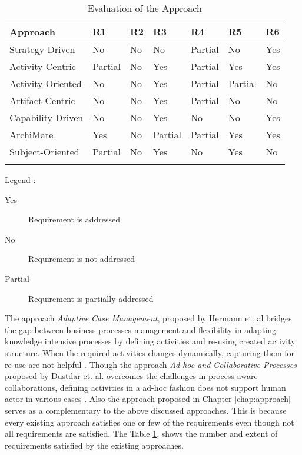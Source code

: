\begin{center}
	\begin{longtable}{p{6cm}p{1.5cm}p{1.5cm}p{1.5cm}p{1.5cm}p{1.5cm}p{2cm}} 
		\toprule 
		\textbf{Approach} & \textbf{R1}  & \textbf{R2}  & \textbf{R3}  & \textbf{R4}  & \textbf{R5} & \textbf{R6} \\
		\midrule
		\endfirsthead
		
		Strategy-Driven & No  & No  & No  & Partial  & No  & Yes\\
		Activity-Centric   & Partial   & No  & Yes  & Partial  & Yes  & Yes \\
		Activity-Oriented    & No  & No  & Yes  & Partial   & Partial  & No \\
		Artifact-Centric    & No  & No  & Yes  & Partial & No  & No \\ %
		Capability-Driven   & No  & No  & Yes  & No  & No  & Yes\\
		ArchiMate  & Yes  & No  & Partial  & Partial  & Yes  & Yes \\
		Subject-Oriented   &Partial  & No  & Yes  & No   & Yes   & No\\
		
		\bottomrule
		\caption{Evaluation of the Approach}
		\label{tab:evaluationoftheapproach}
	\end{longtable}	
\end{center}

Legend :
\begin{description}
	\item[Yes]      Requirement is addressed
	\item[No]       Requirement is not addressed
	\item[Partial]  Requirement is partially addressed
\end{description}

The approach \textit{Adaptive Case Management}, proposed by Hermann et. al \cite{Herrmann2011} bridges the gap between business processes management and flexibility in adapting knowledge intensive processes by defining activities and re-using created activity structure. When the required activities changes dynamically, capturing them for re-use are not helpful \cite{Sungur2015}. Though the approach \textit{Ad-hoc and Collaborative Processes} proposed by Dustdar et. al. overcomes the challenges in process aware collaborations, defining activities in a ad-hoc fashion does not support human actor in various cases \cite{Sungur2015}. Also the approach proposed in Chapter \ref{chap:approach} serves as a complementary to the above discussed  approaches.  This is because every existing approach satisfies one or few of the requirements even though not all requirements are satisfied. The Table \ref{tab:evaluationoftheapproach}, shows the number and extent of requirements satisfied by the existing approaches. 

 


